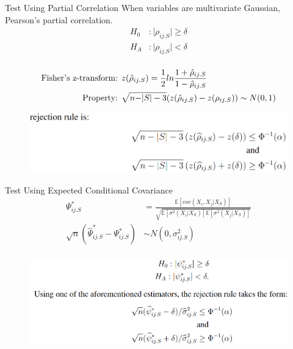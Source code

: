 \documentclass{beamer}
\begin{document}
\begin{frame}{Test Using Partial Correlation}
	\center When variables are multivariate Gaussian, Pearson's partial correlation.
	\vspace{1em}
	\begin{equation*}
		\begin{split}
			H_0&: \rvert \rho_{ij.S} \rvert \ge \delta \\
			H_A&: \rvert \rho_{ij.S} \rvert < \delta \\
		\end{split}
	\end{equation*}

	\begin{equation*}
		\begin{split}
			\textnormal{Fisher's z-transform: }& z(\hat{\rho}_{ij.S}) = \frac{1}{2} ln \frac{1+\hat{\rho}_{ij.S}}{1 - \hat{\rho}_{ij.S}} \\
			\textnormal{Property: }& \sqrt{n - \rvert S \rvert - 3}(z(\hat{\rho}_{ij.S}) - z(\rho_{ij.S})) \sim N(0, 1) \\
		\end{split}
	\end{equation*}
	\begin{figure}
		\centering
		\includegraphics[scale=0.3]{imgs/partial.png}
	\end{figure}
\end{frame}

\begin{frame}{Test Using Expected Conditional Covariance}
	\vspace{1em}
	\begin{equation*}
		\begin{split}
			\Psi^*_{ij.S} &= \frac{\mathbb{E}[cov(X_i, X_j | X_S)]}{\sqrt{\mathbb{E}[\sigma^2(X_i \rvert X_S)] \mathbb{E}[\sigma^2(X_j \rvert X_S)]}} \\
			\sqrt{n}(\hat{\Psi}^*_{ij.S} - \Psi^*_{ij.S}) & \sim N(0, \sigma^2_{ij.S}) \\
		\end{split}
	\end{equation*}
	\begin{figure}
		\centering
		\includegraphics[scale=0.3]{imgs/test2.png}
	\end{figure}
\end{frame}
\end{document}
